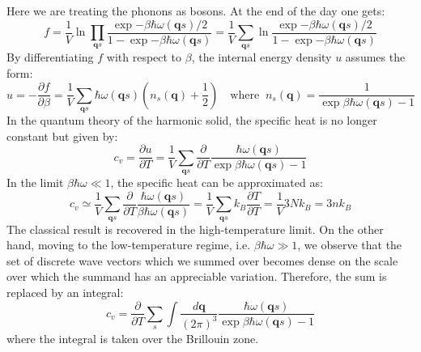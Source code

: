 \documentclass[10.75pt,a4paper,openright,bottom=2cm]{article}
\renewcommand{\Vec}[1]{\boldsymbol{#1}}
\begin{document}
Here we are treating the phonons as bosons. At the end of the day one gets:
\[
f=\frac{1}{V}\ln{\prod_{\Vec{q}s}\frac{\exp{-\beta\hbar\omega(\Vec{q}s)/2}}{1-\exp{-\beta\hbar\omega(\Vec{q}s)}}}=\frac{1}{V}\sum_{\Vec{q}s}\ln{\frac{\exp{-\beta\hbar\omega(\Vec{q}s)/2}}{1-\exp{-\beta\hbar\omega(\Vec{q}s)}}}
\]
By differentiating $f$ with respect to $\beta$, the internal energy density $u$ assumes the form:
\[
u=-\frac{\partial f}{\partial\beta}=\frac{1}{V}\sum_{\Vec{q}s}\hbar\omega(\Vec{q}s)\left(n_s(\Vec{q})+\frac{1}{2}\right) \quad \text{where}\;\; n_s(\Vec{q})=\frac{1}{\exp{\beta\hbar\omega(\Vec{q}s)}-1}
\]
In the quantum theory of the harmonic solid, the specific heat is no longer constant but given by:
\[
c_v=\frac{\partial u}{\partial T}=\frac{1}{V}\sum_{\Vec{q}s}\frac{\partial}{\partial T}\frac{\hbar\omega(\Vec{q}s)}{\exp{\beta\hbar\omega(\Vec{q}s)}-1}
\]
In the limit $\beta\hbar\omega\ll1$, the specific heat can be approximated as:
\[
c_v\simeq\frac{1}{V}\sum_{\Vec{q}s}\frac{\partial}{\partial T}\frac{\hbar\omega(\Vec{q}s)}{\beta\hbar\omega(\Vec{q}s)}=\frac{1}{V}\sum_{\Vec{q}s}k_B\frac{\partial T}{\partial T}=\frac{1}{V}3Nk_B=3nk_B
\]
The classical result is recovered in the high-temperature limit. On the other hand, moving to the low-temperature regime, i.e. $\beta\hbar\omega\gg1$, we observe that the set of discrete wave vectors which we summed over becomes dense on the scale over which the summand has an appreciable variation. Therefore, the sum is replaced by an integral:
\[
c_v=\frac{\partial}{\partial T}\sum_s\int\frac{d\Vec{q}}{(2\pi)^3}\frac{\hbar\omega(\Vec{q}s)}{\exp{\beta\hbar\omega(\Vec{q}s)}-1}
\]
where the integral is taken over the  Brillouin zone.
\end{document}
